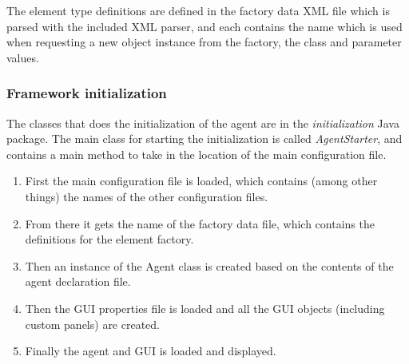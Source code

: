 The element type definitions are defined in the factory data  XML file which is parsed with the included XML parser, and each contains the name which is used when requesting a new object instance from the factory, the class and parameter values.

\subsubsection{Framework initialization}
The classes that does the initialization of the agent are in the {\em initialization} Java package. The main class for starting the initialization is called {\em AgentStarter}, and contains a main method to take in the location of the main configuration file.

\begin{enumerate}
 \item First the main configuration file is loaded, which contains (among other things) the names of the other configuration files.
 \item From there it gets the name of the factory data file, which contains the definitions for the element factory.
 \item Then an instance of the Agent class is created based on the contents of the agent declaration file.
 \item Then the GUI properties file is loaded and all the GUI objects (including custom panels) are created.
 \item Finally the agent and GUI is loaded and displayed.
\end{enumerate}
